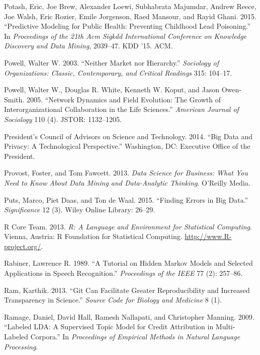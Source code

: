 \documentclass[]{krantz}
\begin{document}
\hypertarget{ref-Potash2015}{}
Potash, Eric, Joe Brew, Alexander Loewi, Subhabrata Majumdar, Andrew
Reece, Joe Walsh, Eric Rozier, Emile Jorgenson, Raed Mansour, and Rayid
Ghani. 2015. ``Predictive Modeling for Public Health: Preventing
Childhood Lead Poisoning.'' In \emph{Proceedings of the 21th Acm Sigkdd
International Conference on Knowledge Discovery and Data Mining},
2039--47. KDD '15. ACM.

\hypertarget{ref-powell2003neither}{}
Powell, Walter W. 2003. ``Neither Market nor Hierarchy.''
\emph{Sociology of Organizations: Classic, Contemporary, and Critical
Readings} 315: 104--17.

\hypertarget{ref-powell2005network}{}
Powell, Walter W., Douglas R. White, Kenneth W. Koput, and Jason
Owen-Smith. 2005. ``Network Dynamics and Field Evolution: The Growth of
Interorganizational Collaboration in the Life Sciences.'' \emph{American
Journal of Sociology} 110 (4). JSTOR: 1132--1205.

\hypertarget{ref-house2014big}{}
President's Council of Advisors on Science and Technology. 2014. ``Big
Data and Privacy: A Technological Perspective.'' Washington, DC:
Executive Office of the President.

\hypertarget{ref-FawcettProvost}{}
Provost, Foster, and Tom Fawcett. 2013. \emph{Data Science for Business:
What You Need to Know About Data Mining and Data-Analytic Thinking}.
O'Reilly Media.

\hypertarget{ref-puts2015finding}{}
Puts, Marco, Piet Daas, and Ton de Waal. 2015. ``Finding Errors in Big
Data.'' \emph{Significance} 12 (3). Wiley Online Library: 26--29.

\hypertarget{ref-cran2013}{}
R Core Team. 2013. \emph{R: A Language and Environment for Statistical
Computing}. Vienna, Austria: R Foundation for Statistical Computing.
\url{http://www.R-project.org/}.

\hypertarget{ref-rabiner-89}{}
Rabiner, Lawrence R. 1989. ``A Tutorial on Hidden Markov Models and
Selected Applications in Speech Recognition.'' \emph{Proceedings of the
IEEE} 77 (2): 257--86.

\hypertarget{ref-ram2013git}{}
Ram, Karthik. 2013. ``Git Can Facilitate Greater Reproducibility and
Increased Transparency in Science.'' \emph{Source Code for Biology and
Medicine} 8 (1).

\hypertarget{ref-ramage-09}{}
Ramage, Daniel, David Hall, Ramesh Nallapati, and Christopher Manning.
2009. ``Labeled LDA: A Supervised Topic Model for Credit Attribution in
Multi-Labeled Corpora.'' In \emph{Proceedings of Empirical Methods in
Natural Language Processing}.
\end{document}
